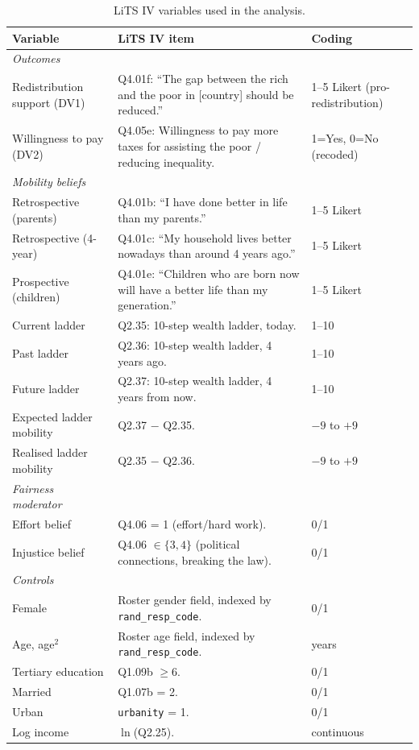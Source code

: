 \documentclass[11pt,a4paper]{article}
\begin{document}
\begin{table}[!ht]
\small
\centering
\caption{LiTS IV variables used in the analysis.}
\label{tab:vars}
\begin{tabularx}{\linewidth}{lXl}
\toprule
\textbf{Variable} & \textbf{LiTS IV item} & \textbf{Coding} \\
\midrule
\textit{Outcomes} & & \\
Redistribution support (DV1) & Q4.01f: ``The gap between the rich and the poor in
[country] should be reduced.'' & 1--5 Likert (pro-redistribution) \\
Willingness to pay (DV2) & Q4.05e: Willingness to pay more taxes for assisting the poor /
reducing inequality. & 1=Yes, 0=No (recoded) \\
\midrule
\textit{Mobility beliefs} & & \\
Retrospective (parents) & Q4.01b: ``I have done better in life than my parents.'' & 1--5 Likert \\
Retrospective (4-year) & Q4.01c: ``My household lives better nowadays than around
4 years ago.'' & 1--5 Likert \\
Prospective (children) & Q4.01e: ``Children who are born now will have a better life
than my generation.'' & 1--5 Likert \\
Current ladder & Q2.35: 10-step wealth ladder, today. & 1--10 \\
Past ladder & Q2.36: 10-step wealth ladder, 4 years ago. & 1--10 \\
Future ladder & Q2.37: 10-step wealth ladder, 4 years from now. & 1--10 \\
Expected ladder mobility & Q2.37 $-$ Q2.35. & $-9$ to $+9$ \\
Realised ladder mobility & Q2.35 $-$ Q2.36. & $-9$ to $+9$ \\
\midrule
\textit{Fairness moderator} & & \\
Effort belief & Q4.06 = 1 (effort/hard work). & 0/1 \\
Injustice belief & Q4.06 $\in\{3,4\}$ (political connections, breaking the law). & 0/1 \\
\midrule
\textit{Controls} & & \\
Female & Roster gender field, indexed by \texttt{rand\_resp\_code}. & 0/1 \\
Age, age$^2$ & Roster age field, indexed by \texttt{rand\_resp\_code}. & years \\
Tertiary education & Q1.09b $\geq 6$. & 0/1 \\
Married & Q1.07b = 2. & 0/1 \\
Urban & \texttt{urbanity} = 1. & 0/1 \\
Log income & $\ln$(Q2.25). & continuous \\
\bottomrule
\end{tabularx}
\end{table}
\end{document}
